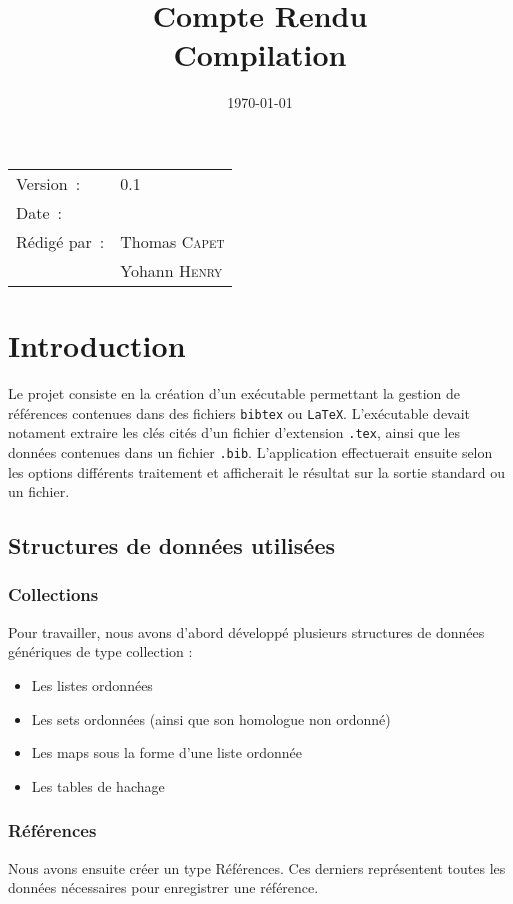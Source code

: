 \documentclass[hidelinks, a4paper,11pt,twoside,final]{article}
\title{\bfseries Compte Rendu \\ Compilation}
\begin{document}
\maketitle
\begin{center}
\begin{tabular}{ll}
  Version~: & 0.1\\[.5em]
  Date~: & \date{\today}\\[.5em]
  Rédigé par~: & Thomas \textsc{Capet}\\
               & Yohann \textsc{Henry}\\
\end{tabular}
\end{center}

\newpage

\newpage
\tableofcontents

\newpage

\section{Introduction}
Le projet consiste en la création d'un exécutable permettant la gestion de références contenues dans des fichiers \texttt{bibtex} ou \texttt{LaTeX}.
L'exécutable devait notament extraire les clés cités d'un fichier d'extension \texttt{.tex}, ainsi que les données contenues dans un fichier \texttt{.bib}.
L'application effectuerait ensuite selon les options différents traitement et afficherait le résultat sur la sortie standard ou un fichier.

\subsection{Structures de données utilisées}
\subsubsection{Collections}
Pour travailler, nous avons d'abord développé plusieurs structures de données génériques de type collection :
\begin{itemize}
 \item Les listes ordonnées 
 \item Les sets ordonnées (ainsi que son homologue non ordonné)
 \item Les maps sous la forme d'une liste ordonnée 
 \item Les tables de hachage
\end{itemize}

\subsubsection{Références}
Nous avons ensuite créer un type Références. Ces derniers représentent toutes les données nécessaires pour enregistrer une référence.
\end{document}
